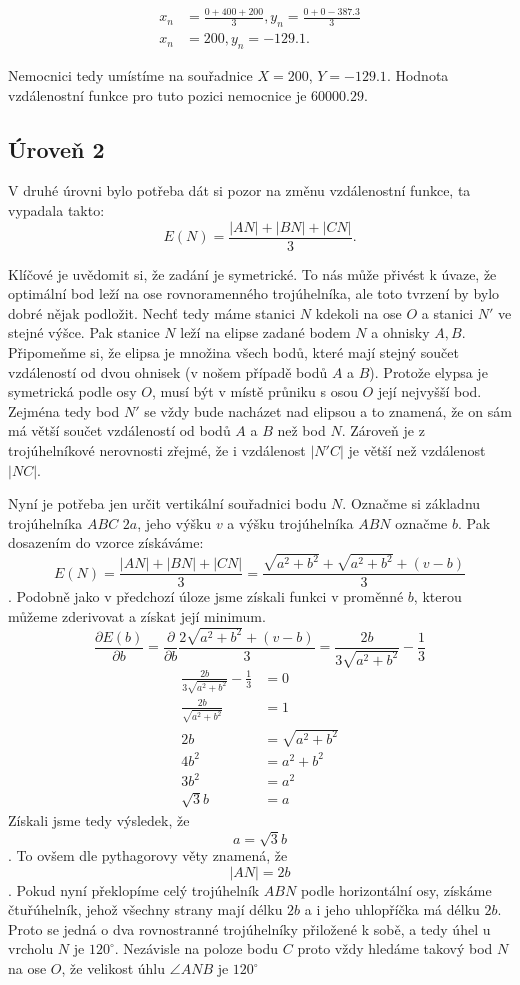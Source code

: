 \documentclass[12pt,a4paper]{article}
\begin{document}
\begin{align}
x_n &= \frac{0 + 400 + 200}{3}, y_n = \frac{0 + 0 - 387.3}{3} \nonumber \\
x_n &= 200, y_n = -129.1  \nonumber.
\end{align}

Nemocnici tedy umístíme na souřadnice $X=200$, $Y=-129.1$. Hodnota vzdálenostní
funkce pro tuto pozici nemocnice je $60000.29$.

\subsection*{Úroveň 2}
V druhé úrovni bylo potřeba dát si pozor na změnu vzdálenostní funkce, ta vypadala takto:
$$E(N) = \frac{|AN| + |BN| + |CN|}{3}.$$

Klíčové je uvědomit si, že zadání je symetrické. To nás může přivést k úvaze, že optimální bod leží na ose rovnoramenného trojúhelníka,
ale toto tvrzení by bylo dobré nějak podložit. Nechť tedy máme stanici $N$ kdekoli na ose $O$ a stanici $N'$ ve stejné výšce. Pak stanice $N$ leží na elipse zadané bodem $N$ a ohnisky $A,B$.
Připomeňme si, že elipsa je množina všech bodů, které mají stejný součet vzdáleností od dvou ohnisek (v nošem případě bodů $A$ a $B$). Protože elypsa je symetrická podle osy $O$,
musí být v místě průniku s osou $O$ její nejvyšší bod. Zejména tedy bod $N'$ se vždy bude nacházet nad elipsou a to znamená, že on sám má větší součet vzdáleností od bodů $A$ a $B$ než bod $N$.
Zároveň je z trojúhelníkové nerovnosti zřejmé, že i vzdálenost $|N'C|$ je větší než vzdálenost $|NC|$.

Nyní je potřeba jen určit vertikální souřadnici bodu $N$.
Označme si základnu trojúhelníka $ABC$ $2a$, jeho výšku $v$ a výšku trojúhelníka $ABN$ označme $b$. Pak dosazením do vzorce získáváme:
$$E(N) = \frac{|AN| + |BN| + |CN|}{3} = \frac{\sqrt{a^2+b^2} + \sqrt{a^2+b^2} + (v - b)}{3}$$.
Podobně jako v předchozí úloze jsme získali funkci v proměnné $b$, kterou můžeme zderivovat a získat její minimum.
$$\frac{\partial E(b)}{\partial b} = \frac{\partial}{\partial b}\frac{2 \sqrt{a^2+b^2} + (v - b)}{3} = \frac{2b}{3 \sqrt{a^2+b^2}} - \frac{1}{3}$$
\begin{align}
\frac{2b}{3 \sqrt{a^2+b^2}} - \frac{1}{3} &= 0 \nonumber \\
\frac{2b}{\sqrt{a^2+b^2}} &= 1 \nonumber \\
2b &= \sqrt{a^2+b^2} \nonumber \\
4b^2 &= a^2 + b^2 \nonumber \\
3b^2 &= a^2 \nonumber \\
\sqrt{3}b &= a \nonumber
\end{align}
Získali jsme tedy výsledek, že $$a = \sqrt{3}b$$. To ovšem dle pythagorovy věty znamená, že $$|AN|=2b$$. Pokud nyní překlopíme celý trojúhelník $ABN$ podle horizontální osy,
získáme čtuřúhelník, jehož všechny strany mají délku $2b$ a i jeho uhlopříčka má délku $2b$. Proto se jedná o dva rovnostranné trojúhelníky přiložené k sobě, a tedy úhel u vrcholu $N$ je $120^\circ$.
Nezávisle na poloze bodu $C$ proto vždy hledáme takový bod $N$ na ose $O$, že velikost úhlu $\angle ANB$ je $120^\circ$
\end{document}
